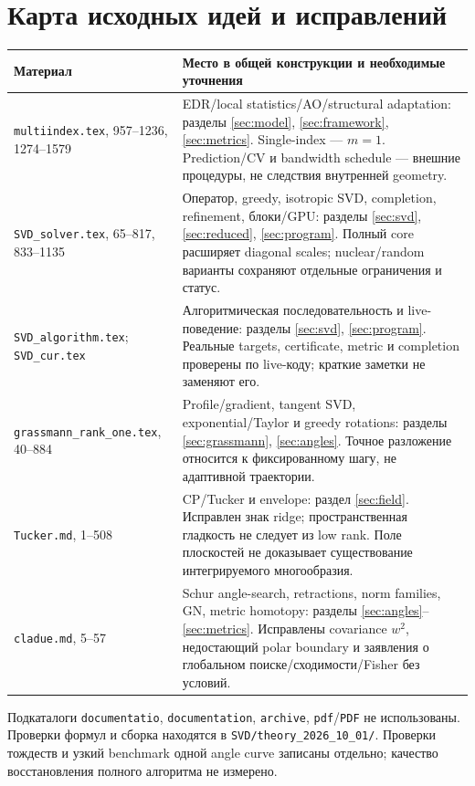 \documentclass[11pt,a4paper]{article}
\begin{document}
\section{Карта исходных идей и исправлений}\label{sec:map}
\begin{center}\small
\begin{tabularx}{\linewidth}{@{}p{38mm}L@{}}
\toprule
Материал & Место в общей конструкции и необходимые уточнения\\
\midrule
\texttt{multiindex.tex}, 957--1236, 1274--1579 &
EDR/local statistics/AO/structural adaptation: разделы
\ref{sec:model}, \ref{sec:framework}, \ref{sec:metrics}.
Single-index --- $m=1$. Prediction/CV и bandwidth schedule --- внешние
процедуры, не следствия внутренней geometry.\\
\texttt{SVD\_solver.tex}, 65--817, 833--1135 &
Оператор, greedy, isotropic SVD, completion, refinement, блоки/GPU:
разделы \ref{sec:svd}, \ref{sec:reduced}, \ref{sec:program}.
Полный core расширяет diagonal scales; nuclear/random варианты сохраняют
отдельные ограничения и статус.\\
\texttt{SVD\_algorithm.tex}; \texttt{SVD\_cur.tex} &
Алгоритмическая последовательность и live-поведение:
разделы \ref{sec:svd}, \ref{sec:program}. Реальные targets, certificate,
metric и completion проверены по live-коду; краткие заметки не заменяют его.\\
\texttt{grassmann\_rank\_}\newline\texttt{one.tex}, 40--884 &
Profile/gradient, tangent SVD, exponential/Taylor и greedy rotations:
разделы \ref{sec:grassmann}, \ref{sec:angles}.
Точное разложение относится к фиксированному шагу, не адаптивной траектории.\\
\texttt{Tucker.md}, 1--508 &
CP/Tucker и envelope: раздел \ref{sec:field}.
Исправлен знак ridge; пространственная гладкость не следует из low rank.
Поле плоскостей не доказывает существование интегрируемого многообразия.\\
\texttt{cladue.md}, 5--57 &
Schur angle-search, retractions, norm families, GN, metric homotopy:
разделы \ref{sec:angles}--\ref{sec:metrics}.
Исправлены covariance $w^2$, недостающий polar boundary и заявления
о глобальном поиске/сходимости/Fisher без условий.\\
\bottomrule
\end{tabularx}
\end{center}
Подкаталоги \texttt{documentatio}, \texttt{documentation},
\texttt{archive}, \texttt{pdf}/\texttt{PDF} не использованы.
Проверки формул и сборка находятся в \texttt{SVD/theory\_2026\_10\_01/}.
Проверки тождеств и узкий benchmark одной angle curve записаны отдельно;
качество восстановления полного алгоритма не измерено.
\end{document}
